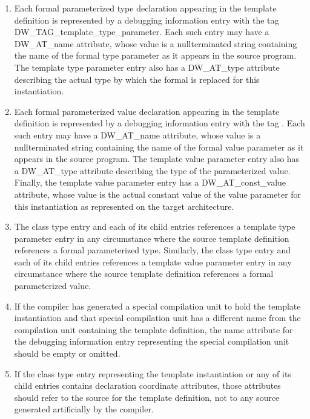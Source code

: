 \begin{enumerate}[1.]
\item Each formal parameterized type declaration appearing in the
template definition is represented by a debugging information
entry with the tag DW\_TAG\_template\_type\_parameter. Each
such entry may have a DW\_AT\_name attribute, whose value is
a null\dash terminated string containing the name of the formal
type parameter as it appears in the source program. The
template type parameter entry also has a DW\_AT\_type attribute
describing the actual type by which the formal is replaced
for this instantiation.

\item Each formal parameterized value declaration appearing in the
template definition is represented by a debugging information
entry with the 
tag . 
Each
such entry may have a DW\_AT\_name attribute, whose value is
a null\dash terminated string containing the name of the formal
value parameter as it appears in the source program. The
template value parameter entry also has a DW\_AT\_type attribute
describing the type of the parameterized value. Finally,
the template value parameter entry has a DW\_AT\_const\_value
attribute, whose value is the actual constant value of the
value parameter for this instantiation as represented on the
target architecture.

\item The class type entry and each of its child entries references
a template type parameter entry in any circumstance where the
source template definition references a formal parameterized
type. Similarly, the class type entry and each of its child
entries references a template value parameter entry in any
circumstance where the source template definition references
a formal parameterized value.

\item If the compiler has generated a special compilation unit to
hold the template instantiation and that special compilation
unit has a different name from the compilation unit containing
the template definition, the name attribute for the debugging
information entry representing the special compilation unit
should be empty or omitted.

\item If the class type entry representing the template
instantiation or any of its child entries contains declaration
coordinate attributes, those attributes should refer to
the source for the template definition, not to any source
generated artificially by the compiler.
\end{enumerate}


